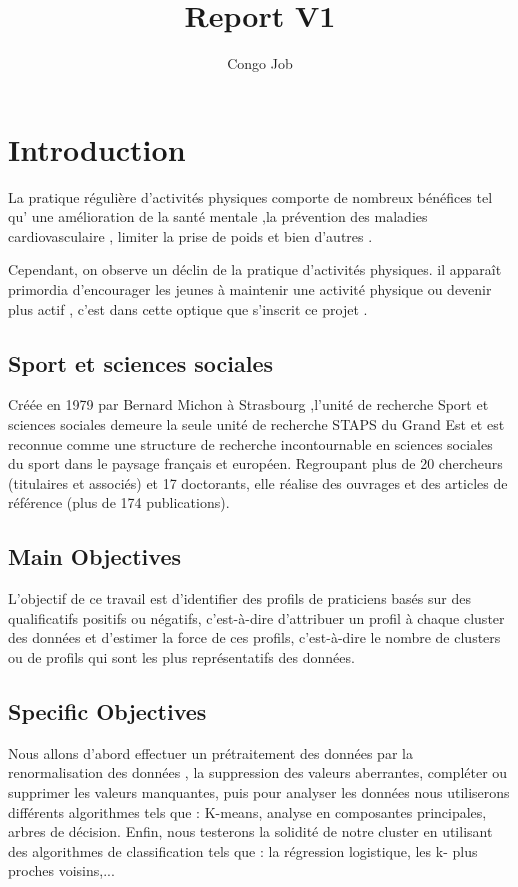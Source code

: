 \documentclass[12pt]{article}
\title{Report V1}
\author{Congo Job}
\begin{document}
    \maketitle

\tableofcontents

\section{Introduction}
La pratique régulière d’activités physiques comporte de nombreux bénéfices tel 
qu' une amélioration de la santé mentale ,la prévention des maladies cardiovasculaire , limiter la prise  de poids et bien d'autres . 

Cependant, on observe un déclin de la pratique d’activités physiques.
il apparaît primordia d’encourager les jeunes à maintenir une activité physique ou devenir plus actif , c'est dans cette optique que s'inscrit ce projet . 



\subsection{Sport et sciences sociales}

Créée en 1979 par Bernard Michon à Strasbourg ,l’unité de recherche Sport et sciences sociales
demeure la seule unité de recherche STAPS du Grand Est et est reconnue comme une structure de recherche incontournable  en sciences sociales du sport dans le paysage français et européen.
Regroupant plus de 20 chercheurs (titulaires et associés) et 17 doctorants, elle réalise  des	ouvrages	et	des	articles de	référence (plus	de	174	publications).




\subsection{Main Objectives}

L'objectif de ce travail est d'identifier des profils de praticiens basés sur des qualificatifs positifs ou négatifs, c'est-à-dire d'attribuer un profil à chaque cluster des données et d'estimer la force de ces profils, c'est-à-dire le nombre de clusters ou de profils qui sont les plus représentatifs des données.


\subsection{Specific Objectives}
Nous allons d'abord effectuer un prétraitement des données par la renormalisation des données , la suppression des valeurs aberrantes,  compléter ou  supprimer les valeurs manquantes, puis pour analyser les données nous utiliserons différents algorithmes tels que : K-means, analyse en composantes principales, arbres de décision. Enfin, nous testerons la solidité de notre cluster en utilisant des algorithmes de classification tels que : la régression logistique, les k- plus proches voisins,...
\end{document}
